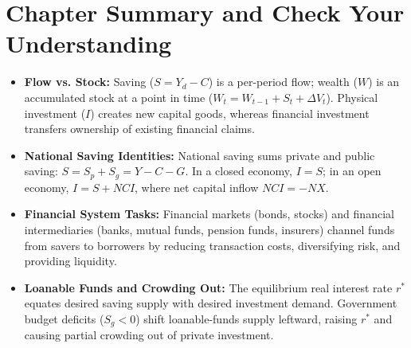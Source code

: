 \documentclass[11pt,letterpaper]{article}
\begin{document}
\section{Chapter Summary and Check Your Understanding}

\begin{takeaways}
\begin{itemize}[noitemsep]
  \item \textbf{Flow vs. Stock:} Saving ($S = Y_d - C$) is a per-period flow; wealth ($W$) is an accumulated stock at a point in time ($W_t = W_{t-1} + S_t + \Delta V_t$). Physical investment ($I$) creates new capital goods, whereas financial investment transfers ownership of existing financial claims.
  \item \textbf{National Saving Identities:} National saving sums private and public saving: $S = S_p + S_g = Y - C - G$. In a closed economy, $I = S$; in an open economy, $I = S + NCI$, where net capital inflow $NCI = -NX$.
  \item \textbf{Financial System Tasks:} Financial markets (bonds, stocks) and financial intermediaries (banks, mutual funds, pension funds, insurers) channel funds from savers to borrowers by reducing transaction costs, diversifying risk, and providing liquidity.
  \item \textbf{Loanable Funds and Crowding Out:} The equilibrium real interest rate $r^*$ equates desired saving supply with desired investment demand. Government budget deficits ($S_g < 0$) shift loanable-funds supply leftward, raising $r^*$ and causing partial crowding out of private investment.
\end{itemize}
\end{takeaways}
\end{document}
